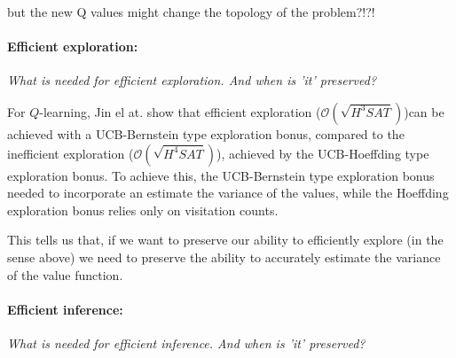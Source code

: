 {\color{red}but the new Q values might change the topology of the problem?!?!}


\paragraph{Efficient exploration:} \textit{What is needed for efficient exploration. And when is 'it' preserved?}

For $Q$-learning, Jin el at. \cite{Bubeck2018} show that efficient exploration ($\mathcal O(\sqrt{H^3SAT})$)\footnotemark[13] can be
achieved with a UCB-Bernstein type exploration bonus, compared to the inefficient exploration ($\mathcal O(\sqrt{H^4SAT})$),
achieved by the UCB-Hoeffding type exploration bonus. To achieve this, the UCB-Bernstein type exploration bonus needed to incorporate an
estimate the variance of the values, while the Hoeffding exploration bonus relies only on visitation counts.


This tells us that, if we want to preserve our ability to efficiently explore (in the sense above) we need to preserve the  ability to accurately estimate the variance of the value function.



\paragraph{Efficient inference:} \textit{What is needed for efficient inference. And when is 'it' preserved?}

